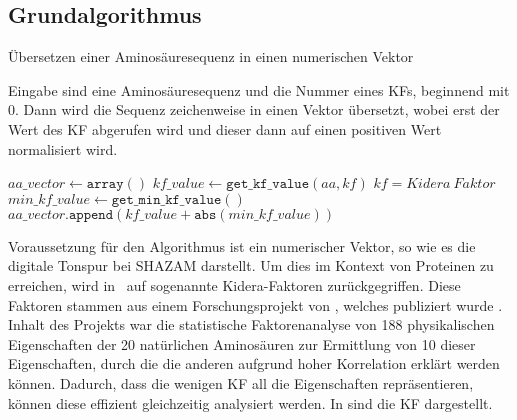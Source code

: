     \subsection{Grundalgorithmus} %
        \label{sub:grundalgorithmus}
        \begin{algorithm}[H]
            \caption{Übersetzen einer Aminosäuresequenz in einen numerischen Vektor}\label{alg:vorbereitung}
            Eingabe sind eine Aminosäuresequenz und die Nummer eines \acl{KF}s, beginnend mit 0. Dann wird die Sequenz zeichenweise in einen Vektor übersetzt, wobei erst der Wert des \ac{KF} abgerufen wird und dieser dann auf einen positiven Wert normalisiert wird.
            \newcommand{\I}{\text{\textquotesingle}}
            \begin{algorithmic}[1]

                \myRequire{
                    $sequence \in \{ \text{A-Z}, \I\Psi\I, \I\Omega\I, \I\Phi\I, \I\zeta\I, \I\Pi\I, \I\text{+}\I, \I\text{-}\I\}^{*} $\\
                    $0 \leq kf \leq 9$
                }

                \State $aa\_vector \gets \texttt{array}()$
                    \State $kf\_value \gets \texttt{get\_kf\_value}(aa, kf)$ \Comment $kf=Kidera\ Faktor$
                    \State $min\_kf\_value \gets \texttt{get\_min\_kf\_value}()$
                    \State $aa\_vector.\texttt{append}(kf\_value + \texttt{abs}(min\_kf\_value))$
                \EndFor
            \end{algorithmic}
        \end{algorithm}
        Voraussetzung für den Algorithmus ist ein numerischer Vektor, so wie es die digitale Tonspur bei SHAZAM darstellt. Um dies im Kontext von Proteinen zu erreichen, wird in \protfin\ auf sogenannte Kidera-Faktoren zurückgegriffen. Diese Faktoren stammen aus einem Forschungsprojekt von \citeauthor{kidera}, welches  publiziert wurde \autocite{kidera}. Inhalt des Projekts war die statistische Faktorenanalyse von 188 physikalischen Eigenschaften der 20 natürlichen Aminosäuren zur Ermittlung von 10 dieser Eigenschaften, durch die die anderen aufgrund hoher Korrelation erklärt werden können. Dadurch, dass die wenigen \ac{KF} all die Eigenschaften repräsentieren, können diese effizient gleichzeitig analysiert werden. In  sind die \ac{KF} dargestellt.

